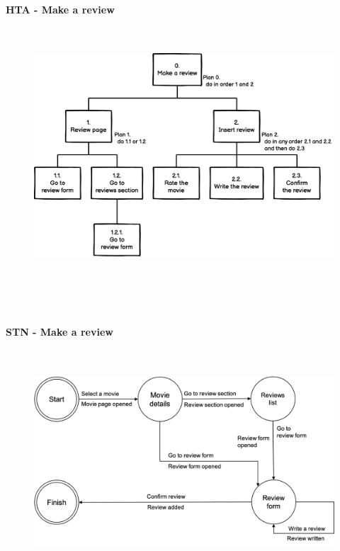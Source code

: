 \documentclass[12pt, a4paper]{article}
\numberwithin{figure}{section}
\begin{document}
\paragraph{HTA - Make a review}\mbox{}\\
\begin{figure}[H]
	\centering
	\includegraphics[width=1\textwidth]{images/Make a review HTA.png}\\
\end{figure}
\mbox{}\\\\\\
\paragraph{STN - Make a review}\mbox{}\\
\begin{figure}[H]
	\centering
	\includegraphics[width=1\textwidth]{images/MakeAReviewSTN.png}\\
\end{figure}
\end{document}

